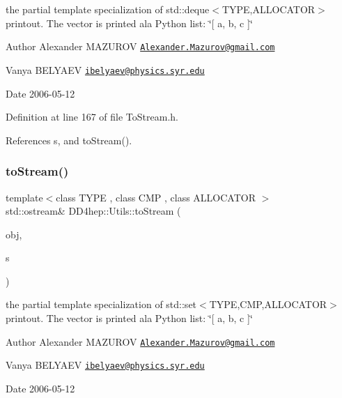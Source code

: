 the partial template specialization of {\ttfamily std\+::deque$<$\+T\+Y\+P\+E,\+A\+L\+L\+O\+C\+A\+T\+O\+R$>$} printout. The vector is printed a\textquotesingle{}la Python list\+: \char`\"{}\mbox{[} a, b, c \mbox{]}\char`\"{} \begin{DoxyAuthor}{Author}
Alexander M\+A\+Z\+U\+R\+OV \href{mailto:Alexander.Mazurov@gmail.com}{\tt Alexander.\+Mazurov@gmail.\+com} 

Vanya B\+E\+L\+Y\+A\+EV \href{mailto:ibelyaev@physics.syr.edu}{\tt ibelyaev@physics.\+syr.\+edu} 
\end{DoxyAuthor}
\begin{DoxyDate}{Date}
2006-\/05-\/12 
\end{DoxyDate}


Definition at line 167 of file To\+Stream.\+h.



References s, and to\+Stream().

\hypertarget{namespace_d_d4hep_1_1_utils_afaa532b1449559b0d94fc5ea4ff89e0f}{}\label{namespace_d_d4hep_1_1_utils_afaa532b1449559b0d94fc5ea4ff89e0f} 
\subsubsection{\texorpdfstring{to\+Stream()}{toStream()}\hspace{0.1cm}{\footnotesize\ttfamily [12/22]}}
{\footnotesize\ttfamily template$<$class T\+Y\+PE , class C\+MP , class A\+L\+L\+O\+C\+A\+T\+OR $>$ \\
std\+::ostream\& D\+D4hep\+::\+Utils\+::to\+Stream (\begin{DoxyParamCaption}\item[{const std\+::set$<$ T\+Y\+PE, C\+MP, A\+L\+L\+O\+C\+A\+T\+OR $>$ \&}]{obj,  }\item[{std\+::ostream \&}]{s }\end{DoxyParamCaption})\hspace{0.3cm}{\ttfamily [inline]}}

the partial template specialization of {\ttfamily std\+::set$<$\+T\+Y\+P\+E,\+C\+M\+P,\+A\+L\+L\+O\+C\+A\+T\+O\+R$>$} printout. The vector is printed a\textquotesingle{}la Python list\+: \char`\"{}\mbox{[} a, b, c \mbox{]}\char`\"{} \begin{DoxyAuthor}{Author}
Alexander M\+A\+Z\+U\+R\+OV \href{mailto:Alexander.Mazurov@gmail.com}{\tt Alexander.\+Mazurov@gmail.\+com} 

Vanya B\+E\+L\+Y\+A\+EV \href{mailto:ibelyaev@physics.syr.edu}{\tt ibelyaev@physics.\+syr.\+edu} 
\end{DoxyAuthor}
\begin{DoxyDate}{Date}
2006-\/05-\/12 
\end{DoxyDate}


